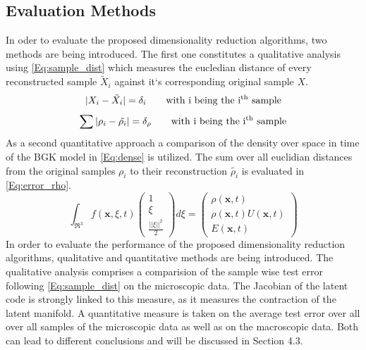 \documentclass[12pt, a4paper]{article}
\newcommand{\colvec}[1]{\ensuremath{\begin{pmatrix}#1\end{pmatrix}}}
\begin{document}
\subsection{Evaluation Methods}
In oder to evaluate the proposed dimensionality reduction algorithms, two methods are being introduced. The first one constitutes a qualitative analysis using \cref{Eq:sample_dist} which measures the eucledian distance of every reconstructed sample $\tilde{X}_i$ against it`s corresponding original sample $X$.
\begin{equation}
	|X_i-\tilde{X_i}| = \delta_i \qquad\textrm{with i being the i\textsuperscript{th} sample}
	\label{Eq:sample_dist}
\end{equation}
\begin{equation}
	\sum|\rho_i-\tilde{\rho_i}|=\delta_\rho \qquad\textrm{with i being the i\textsuperscript{th} sample}
	\label{Eq:error_rho}
\end{equation}
As a second quantitative approach a comparison of the density over space in time of the BGK model in \cref{Eq:dense} is utilized. The sum over all euclidian distances from the original samples $\rho_i$ to their reconstruction $\tilde{\rho_i}$ is evaluated in \cref{Eq:error_rho}. 
\begin{equation}
\int_{\Re^3}f(\textbf{x},\xi,t)\colvec{1\\\xi\\\frac{||\xi||^2}{2}}d\xi= \colvec{\rho(\textbf{x},t)\\\rho(\textbf{x},t)U(\textbf{x},t)\\E(\textbf{x},t)}
\label{Eq:dense}
\end{equation}
In order to evaluate the performance of the proposed dimensionality reduction algorithms, qualitative and quantitative methods are being introduced. The qualitative analysis comprises a comparision of the sample wise test error following \cref{Eq:sample_dist} on the microscopic data. The Jacobian of the latent code is strongly linked to this measure, as it measures the contraction of the latent manifold. A quantitative measure is taken on the average test error over all over all samples of the microscopic data as well as on the macroscopic data. Both can lead to different conclusions and will be discussed in Section 4.3.
\end{document}
